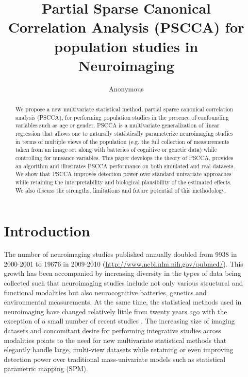 \documentclass{llncs}
\begin{document}
\vspace{-0.1in}
\title{Partial Sparse Canonical Correlation Analysis (PSCCA) for population
  studies in Neuroimaging}
\author{Anonymous}
\maketitle              
\begin{abstract}
We propose a new multivariate statistical method, partial sparse
canonical correlation analysis (PSCCA), for performing population
studies in the presence of confounding variables such as age or
gender.  PSCCA is a multivariate generalization of linear regression
that allows one to naturally statistically parameterize neuroimaging
studies in terms of multiple views of the population (e.g. the full
collection of measurements taken from an image set along with
batteries of cognitive or genetic data) while controlling for nuisance
variables.  This paper develops the theory of PSCCA, provides an
algorithm and illustrates PSCCA performance on both simulated and real
datasets.  We show that PSCCA improves detection power over standard
univariate approaches while retaining the interpretability and
biological plausibility of the estimated effects.  We also discuss the
strengths, limitations and future potential of this methodology.
\end{abstract}
\section{Introduction}
The number of neuroimaging studies published annually doubled from
9938 in 2000-2001 to 19676 in 2009-2010
(\url{http://www.ncbi.nlm.nih.gov/pubmed/}).  This growth has been
accompanied by increasing diversity in the types of data being
collected such that neuroimaging studies include not only various
structural and functional modalities but also neurocognitive
batteries, genetics and environmental measurements.  At the same time,
the statistical methods used in neuroimaging have changed relatively
little from twenty years ago with the exception of a small number of
recent studies \cite{Tosun2010a}.  The increasing size of imaging
datasets and concomitant desire for performing integrative studies
across modalities points to the need for new multivariate statistical
methods that elegantly handle large, multi-view datasets while
retaining or even improving detection power over traditional
mass-univariate models such as statistical parametric mapping (SPM).
\end{document}
